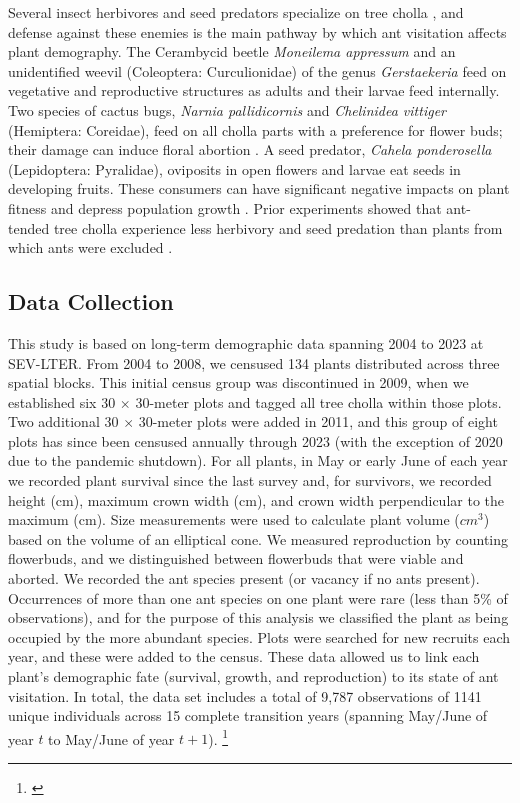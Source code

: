 \documentclass[11pt]{article}
\newcommand{\tom}[2]{{\color{red}{#1}}\footnote{\textit{\color{red}{#2}}}}
\begin{document}
Several insect herbivores and seed predators specialize on tree cholla \citep{Mann1969}, and defense against these enemies is the main pathway by which ant visitation affects plant demography. 
The Cerambycid beetle \textit{Moneilema appressum} and an unidentified weevil (Coleoptera: Curculionidae) of the genus \textit{Gerstaekeria} feed on vegetative and reproductive structures as adults and their larvae feed internally. 
Two species of cactus bugs, \textit{Narnia pallidicornis} and \textit{Chelinidea vittiger} (Hemiptera: Coreidae), feed on all cholla parts with a preference for flower buds; their damage can induce floral abortion \citep{Miller2006}. 
A seed predator, \textit{Cahela ponderosella} (Lepidoptera: Pyralidae), oviposits in open flowers and larvae eat seeds in developing fruits. 
These consumers can have significant negative impacts on plant fitness and depress population growth \citep{Miller2009}.
Prior experiments showed that ant-tended tree cholla experience less herbivory and seed predation than plants from which ants were excluded \citep{Miller2007,Ohm2014}. 

\subsection*{Data Collection}
This study is based on long-term demographic data spanning 2004 to 2023 at SEV-LTER. 
From 2004 to 2008, we censused 134 plants distributed across three spatial blocks. 
This initial census group was discontinued in 2009, when we established six 30 $\times$ 30-meter plots and tagged all tree cholla within those plots. 
Two additional 30 $\times$ 30-meter plots were added in 2011, and this group of eight plots has since been censused annually through 2023 (with the exception of 2020 due to the pandemic shutdown). 
For all plants, in May or early June of each year we recorded plant survival since the last survey and, for survivors, we recorded height (cm), maximum crown width (cm), and crown width perpendicular to the maximum (cm).
Size measurements were used to calculate plant volume ($cm^3$) based on the volume of an elliptical cone. 
We measured reproduction by counting flowerbuds, and we distinguished between flowerbuds that were viable and aborted. 
We recorded the ant species present (or vacancy if no ants present).
Occurrences of more than one ant species on one plant were rare (less than 5\% of observations), and for the purpose of this analysis we classified the plant as being occupied by the more abundant species. 
Plots were searched for new recruits each year, and these were added to the census.
These data allowed us to link each plant's demographic fate (survival, growth, and reproduction) to its state of ant visitation. 
In total, the data set includes a total of 9,787 observations of 1141 unique individuals across 15 complete transition years (spanning May/June of year $t$ to May/June of year $t+1$). 
\tom{}{You should cite the data package here. The published package only goes up to 2018, so we should talk about updating that package with you as lead author, which should be easy to do as long as the data are QAQC'd.}
\end{document}
